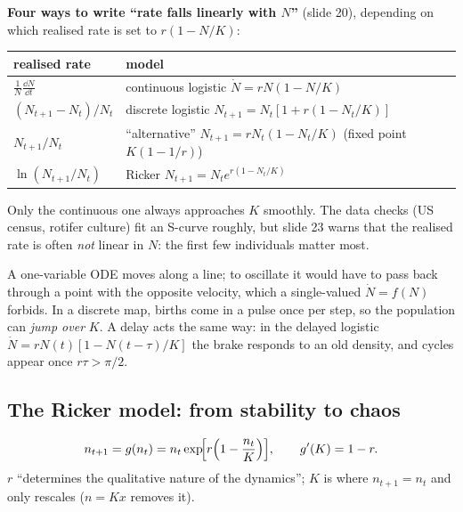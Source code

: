 \textbf{Four ways to write ``rate falls linearly with $N$''} (slide 20), depending on which realised rate is set to
$r(1-N/K)$:
\begin{center}\small
\begin{tabular}{ll}
\toprule
realised rate & model\\\midrule
$\frac1N\frac{\dd N}{\dd t}$ & continuous logistic $\dot N=rN(1-N/K)$\\
$(N_{t+1}-N_t)/N_t$ & discrete logistic $N_{t+1}=N_t[1+r(1-N_t/K)]$\\
$N_{t+1}/N_t$ & ``alternative'' $N_{t+1}=rN_t(1-N_t/K)$ (fixed point $K(1-1/r)$)\\
$\ln(N_{t+1}/N_t)$ & Ricker $N_{t+1}=N_te^{r(1-N_t/K)}$\\\bottomrule
\end{tabular}
\end{center}
Only the continuous one always approaches $K$ smoothly. The data checks (US census, rotifer culture) fit an S-curve
roughly, but slide 23 warns that the realised rate is often \emph{not} linear in $N$: the first few individuals
matter most.

\begin{chain}
A one-variable ODE moves along a line; to oscillate it would have to pass back through a point with the opposite
velocity, which a single-valued $\dot N=f(N)$ forbids. In a discrete map, births come in a pulse once per step, so the
population can \emph{jump over} $K$. A delay acts the same way: in the delayed logistic
$\dot N=rN(t)[1-N(t-\tau)/K]$ the brake responds to an old density, and cycles appear once $r\tau>\pi/2$.
\end{chain}

\subsection{The Ricker model: from stability to chaos}
\[
n_{t+1}=g(n_t)=n_t\exp\!\Bigl[r\Bigl(1-\frac{n_t}{K}\Bigr)\Bigr],\qquad g'(K)=1-r.
\]
$r$ ``determines the qualitative nature of the dynamics''; $K$ is where $n_{t+1}=n_t$ and only rescales ($n=Kx$
removes it).

